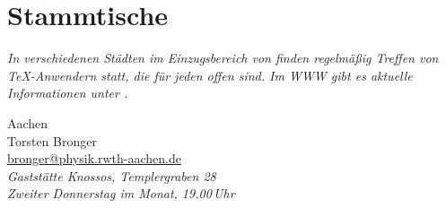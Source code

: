 \chapter{Stammtische}
\markboth{}{}
\bgroup\small
\emph{In verschiedenen Städten im Einzugsbereich von \dante{} finden
  regelmäßig Treffen von \TeX-Anwendern statt, die für jeden offen
  sind. Im WWW gibt es aktuelle Informationen unter
  .
}
\vspace*{2pt}

\begin{multicols}{2}\small\raggedright\raggedcolumns
  \renewcommand\rolllabel[1]{\hspace\labelsep\bf #1\hfill}
  \begin{roll}\footnotesize
    \setlength{\itemsep}{-.5ex}
  \item[Aachen] \ \\
    Torsten Bronger\\ \url{bronger@physik.rwth-aachen.de}\\
    \emph{Gaststätte Knossos, Templergraben 28\\
    Zweiter Donnerstag im Monat, 19.00\,Uhr}


\end{roll}
\end{multicols}
